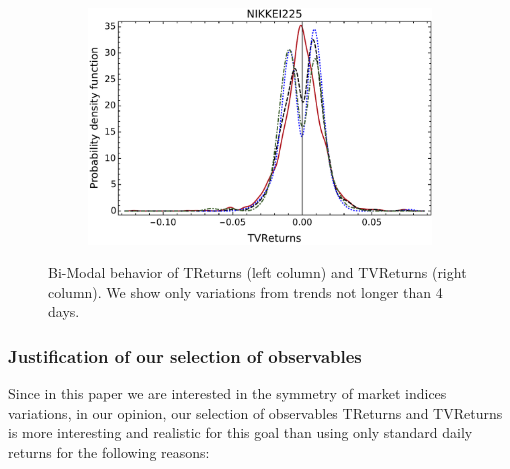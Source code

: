 \documentclass{elsarticle}
\begin{document}
\begin{figure}[h!tb]
\begin{subfigure}[b]{0.45\textwidth}
        \includegraphics[scale=0.3]{figures/Distributions/nikkei_distbyruns_vtret.pdf}
    \end{subfigure}
    
    \caption{Bi-Modal behavior of TReturns (left column) and TVReturns (right column). We show only variations from trends not longer than 4 days.}
    \label{fig:TRetsMulTiTrends}
\end{figure}

\subsubsection{Justification of our selection of observables}
\label{Observables}
Since in this paper we are interested in the symmetry of market indices variations, in our opinion, our selection of observables TReturns and TVReturns is more interesting and realistic for this goal than using only standard daily returns for the following reasons:
\end{document}
